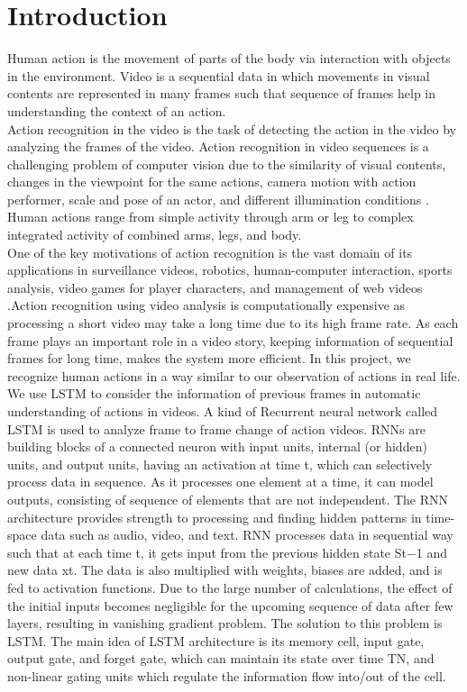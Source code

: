 \documentclass[a4paper,12pt]{article}
\begin{document}
\section{Introduction} Human action is the movement of parts of the body via interaction with objects in the environment. Video is a sequential data in which movements in visual contents are represented in many frames such that sequence of frames help in understanding the context of an action.\\ Action recognition in the video is the task of detecting the action in the video by analyzing the frames of the video. Action recognition in video sequences is a challenging problem of computer vision due to the similarity of visual contents\cite{nanda2019illumination}, changes in the viewpoint for the same actions, camera motion with action performer, scale and pose of an actor, and different illumination conditions \cite{soomro2012ucf101}. Human actions range from simple activity through arm or leg to complex integrated activity of combined arms, legs, and body.\\ One of the key motivations of action recognition is the vast domain of its applications in surveillance videos\cite{nanda2017neuromorphic}, robotics, human-computer interaction\cite{aly2013data}, sports analysis, video games for player characters, and management of web videos \cite{yue2015beyond}.Action recognition using video analysis is computationally expensive as processing a short video may take a long time due to its high frame rate. As each frame plays an important role in a video story, keeping information of sequential frames for long time, makes the system more efficient. In this project, we recognize human actions in a way similar to our observation of actions in real life. We use LSTM to consider the information of previous frames in automatic understanding of actions in videos. A kind of  Recurrent neural network called LSTM is used to analyze frame to frame change of action videos. RNNs are building blocks of a connected neuron with input units, internal (or hidden) units, and output units, having an activation at time t, which can selectively process data in sequence. As it processes one element at a time, it can model outputs, consisting of sequence of elements that are not independent\cite{lipton2015critical}. The RNN architecture provides strength to processing and finding hidden patterns in time-space data such as audio, video, and text. RNN processes data in sequential way such that at each time t, it gets input from the previous hidden state St−1 and new data xt. The data is also multiplied with weights, biases are added, and is fed to activation functions. Due to the large number of calculations, the effect of the initial inputs becomes negligible for the upcoming sequence of data after few layers, resulting in vanishing gradient problem. The solution to this problem is LSTM. The main idea of LSTM architecture is its memory cell, input gate, output gate, and forget gate, which can maintain its state over time TN, and non-linear gating units which regulate the information flow into/out of the cell\cite{greff2016lstm}. \\
\end{document}
